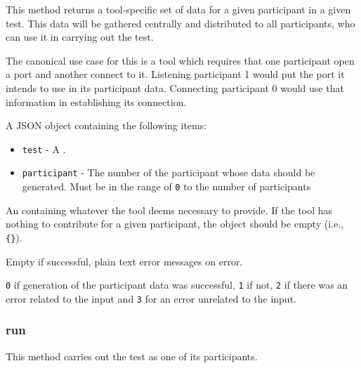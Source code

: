 \documentclass[10pt,titlepage]{article}
\begin{document}
This method returns a tool-specific set of data for a given
participant in a given test.  This data will be gathered centrally and
distributed to all participants, who can use it in carrying out the test.

The canonical use case for this is a tool which requires that one
participant open a port and another connect to it.  Listening
participant 1 would put the port it intends to use in its participant
data.  Connecting participant 0 would use that information in
establishing its connection.


 A JSON object containing the following items:

\begin{itemize}
\item{\tt test} - A .

\item{\tt participant} - The number of the participant whose data
  should be generated.  Must be in the range of {\tt 0} to the number
  of participants
\end{itemize}


 An  containing
whatever the tool deems necessary to provide.  If the tool has nothing
to contribute for a given participant, the object should be empty
(i.e., {\tt \{\}}).

 Empty if successful, plain text error
messages on error.

 {\tt 0} if generation of the participant
data was successful, {\tt 1} if not, {\tt 2} if there was an error
related to the input and {\tt 3} for an error unrelated to the input.



\subsubsection{run}
This method carries out the test as one of its participants.
\end{document}
